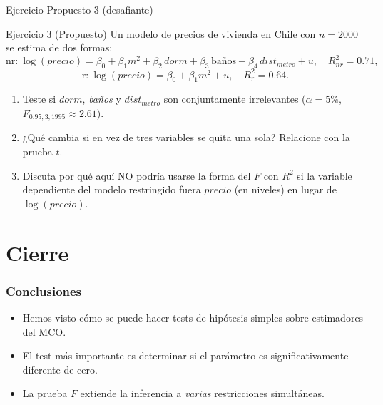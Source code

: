 \documentclass{beamer}
\begin{document}
\begin{frame}{Ejercicio Propuesto 3 (desafiante)}

\begin{block}{Ejercicio 3 (Propuesto)}
Un modelo de precios de vivienda en Chile con $n = 2000$ se estima de dos formas:
\[
\text{nr:}\ \log(precio) = \beta_0 + \beta_1 m^2 + \beta_2\, dorm + \beta_3\, \text{ba\~nos} + \beta_4\, dist_{metro} + u,\quad R^2_{nr}=0.71,
\]
\[
\text{r:}\ \log(precio) = \beta_0 + \beta_1 m^2 + u,\quad R^2_{r}=0.64.
\]
\begin{enumerate}
    \item Teste si $dorm$, \emph{baños} y $dist_{metro}$ son conjuntamente irrelevantes ($\alpha=5\%$, $F_{0.95;3,1995}\approx 2.61$).
    \item ¿Qué cambia si en vez de tres variables se quita una sola? Relacione con la prueba $t$.
    \item Discuta por qué aquí NO podría usarse la forma del $F$ con $R^2$ si la variable dependiente del modelo restringido fuera $precio$ (en niveles) en lugar de $\log(precio)$.
\end{enumerate}
\end{block}

\end{frame}

\section{Cierre}

\begin{frame}
\frametitle{Conclusiones}
\begin{itemize}
    \item Hemos visto cómo se puede hacer tests de hipótesis simples sobre estimadores del MCO.
    \item El test más importante es determinar si el parámetro es significativamente diferente de cero.
    \item La prueba $F$ extiende la inferencia a \emph{varias} restricciones simultáneas.
\end{itemize}
\end{frame}
\end{document}
